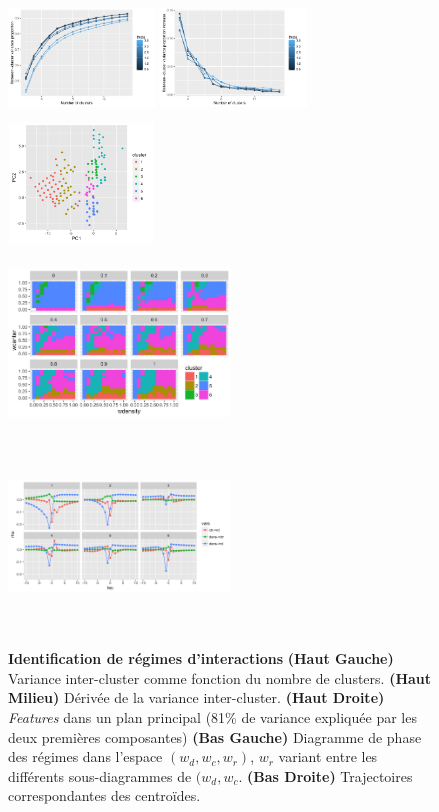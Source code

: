 \documentclass[english]{./sageo}
\begin{document}
\begin{figure}[h]
\centering
\includegraphics[width=3.9cm,height=3.2cm]{ccoef-knum_valuesFALSE_theta05-3.pdf}
\includegraphics[width=3.9cm,height=3.2cm]{dccoef-knum_valuesFALSEtheta05-3.pdf}
\includegraphics[width=3.9cm,height=3.2cm]{clusters-PCA-features_valuesFALSEtheta2_k6}\\
\includegraphics[width=5.9cm,height=5cm]{clusters-paramfacet_valuesFALSEtheta2_k6}
\includegraphics[width=5.9cm,height=5cm]{clusters-centertrajs-facetclust_valuesFALSEtheta2_k6}
\caption{\textbf{Identification de régimes d'interactions} \textbf{(Haut Gauche)} Variance inter-cluster comme fonction du nombre de clusters. \textbf{(Haut Milieu)} Dérivée de la variance inter-cluster. \textbf{(Haut Droite)} \emph{Features} dans un plan principal (81\% de variance expliquée par les deux premières composantes) \textbf{(Bas Gauche)} Diagramme de phase des régimes dans l'espace $(w_{d},w_{c},w_{r})$, $w_r$ variant entre les différents sous-diagrammes de $(w_{d},w_{c}$. \textbf{(Bas Droite)} Trajectoires correspondantes des centroïdes.}
\label{fig:clustering}
\end{figure}
\end{document}
